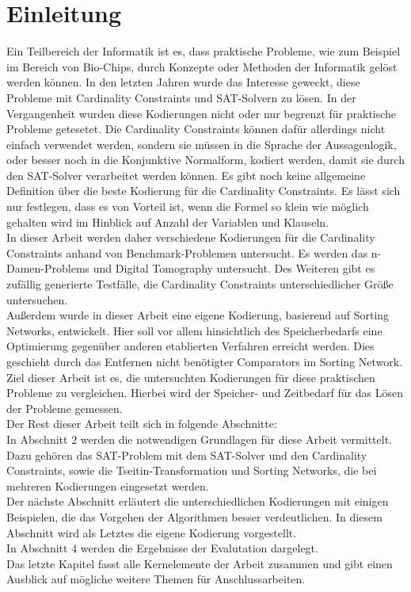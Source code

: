 \documentclass[a4,abstract=on]{scrartcl}
\newcommand*\stdsection{}
\let\stdsection\section
\renewcommand*\section{%
    \clearpage\ifodd\value{page}\else\mbox{}\clearpage\fi
    \stdsection}
\begin{document}
\section{Einleitung}
Ein Teilbereich der Informatik ist es, dass praktische Probleme, wie zum Beispiel im Bereich von Bio-Chips, durch Konzepte oder Methoden der Informatik gelöst werden können.
In den letzten Jahren wurde das Interesse geweckt, diese Probleme mit Cardinality Constraints und SAT-Solvern zu lösen. In der Vergangenheit wurden diese Kodierungen nicht oder nur begrenzt für praktische Probleme getesetet. Die Cardinality Constraints können dafür allerdings nicht einfach verwendet werden, sondern sie müssen in die Sprache der Aussagenlogik, oder besser noch in die Konjunktive Normalform, kodiert werden, damit sie durch den SAT-Solver verarbeitet werden können. Es gibt noch keine allgemeine Definition über die beste Kodierung für die Cardinality Constraints. Es lässt sich nur festlegen, dass es von Vorteil ist, wenn die Formel so klein wie möglich gehalten wird im Hinblick auf Anzahl der Variablen und Klauseln.\\
In dieser Arbeit werden daher verschiedene Kodierungen für die Cardinality Constraints anhand von Benchmark-Problemen untersucht. Es werden das n-Damen-Problems und Digital Tomography untersucht. Des Weiteren gibt es zufällig generierte Testfälle, die Cardinality Constraints unterschiedlicher Größe untersuchen. \\
Außerdem wurde in dieser Arbeit eine eigene Kodierung, basierend auf Sorting Networks, entwickelt. Hier soll vor allem hinsichtlich des Speicherbedarfs eine Optimierung gegenüber anderen etablierten Verfahren erreicht werden. Dies geschieht durch das Entfernen nicht benötigter Comparators im Sorting Network. 
Ziel dieser Arbeit ist es, die untersuchten Kodierungen für diese praktischen Probleme zu vergleichen. Hierbei wird der Speicher- und Zeitbedarf für das Lösen der Probleme gemessen. \\
\newline
Der Rest dieser Arbeit teilt sich in folgende Abschnitte:\\
In Abschnitt $2$ werden die notwendigen Grundlagen für diese Arbeit vermittelt. Dazu gehören das SAT-Problem mit dem SAT-Solver und den Cardinality Constraints, sowie die Tseitin-Transformation und Sorting Networks, die bei mehreren Kodierungen eingesetzt werden.\\
Der nächste Abschnitt erläutert die unterschiedlichen Kodierungen mit einigen Beispielen, die das Vorgehen der Algorithmen besser verdeutlichen. In diesem Abschnitt wird als Letztes die eigene Kodierung vorgestellt.\\
In Abschnitt $4$ werden die Ergebnisse der Evalutation dargelegt. \\
Das letzte Kapitel fasst alle Kernelemente der Arbeit zusammen und gibt einen Ausblick auf mögliche weitere Themen für Anschlussarbeiten.
\end{document}
